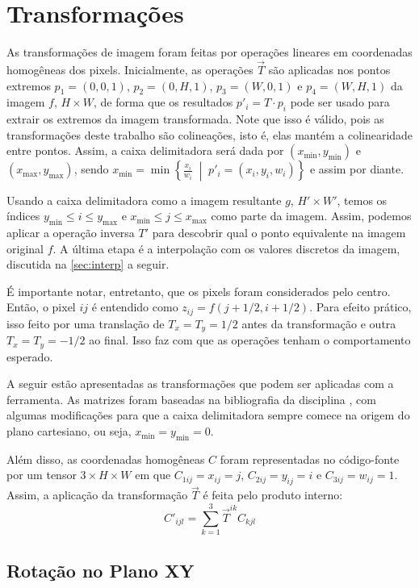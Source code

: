 \section{Transformações} \label{sec:transformacoes}

As transformações de imagem foram feitas por operações lineares em coordenadas homogêneas dos pixels. Inicialmente, as operações $\vec{T}$ são aplicadas nos pontos extremos $p_1 = (0, 0, 1)$, $p_2 = (0, H, 1)$, $p_3 = (W, 0, 1)$ e $p_4 = (W, H, 1)$ da imagem $f$, $H \times W$, de forma que os resultados $p'_i = T \cdot p_i$ pode ser usado para extrair os extremos da imagem transformada. Note que isso é válido, pois as transformações deste trabalho são colineações, isto é, elas mantém a colinearidade entre pontos. Assim, a caixa delimitadora \autocite{bbox} será dada por $(x_{\min}, y_{\min})$ e $(x_{\max}, y_{\max})$, sendo $x_{\min} = \min\left\{ \frac{x_i}{w_i} \;\middle|\; p'_i = (x_i, y_i, w_i)\right\}$ e assim por diante.

Usando a caixa delimitadora como a imagem resultante $g$, $H' \times W'$, temos os índices $y_{\min} \leq i \leq y_{\max}$ e $x_{\min} \leq j \leq x_{\max}$ como parte da imagem. Assim, podemos aplicar a operação inversa $T'$ para descobrir qual o ponto equivalente na imagem original $f$. A última etapa é a interpolação com os valores discretos da imagem, discutida na \cref{sec:interp} a seguir.

É importante notar, entretanto, que os pixels foram considerados pelo centro. Então, o pixel $ij$ é entendido como $z_{ij} = f(j + 1/2, i + 1/2)$. Para efeito prático, isso feito por uma translação de $T_x = T_y = 1/2$ antes da transformação e outra $T_x = T_y = -1/2$ ao final. Isso faz com que as operações tenham o comportamento esperado.

A seguir estão apresentadas as transformações que podem ser aplicadas com a ferramenta. As matrizes foram baseadas na bibliografia da disciplina \autocite{helio}, com algumas modificações para que a caixa delimitadora sempre comece na origem do plano cartesiano, ou seja, $x_{\min} = y_{\min} = 0$.

Além disso, as coordenadas homogêneas $C$ foram representadas no código-fonte por um tensor $3 \times H \times W$ em que $C_{1ij} = x_{ij} = j$, $C_{2ij} = y_{ij} = i$ e $C_{3ij} = w_{ij} = 1$. Assim, a aplicação da transformação $\vec{T}$ é feita pelo produto interno:
\[
    C'_{ijl} = \sum_{k = 1}^3 \vec{T}^{ik} C_{kjl}
\]

\subsection{Rotação no Plano XY}


